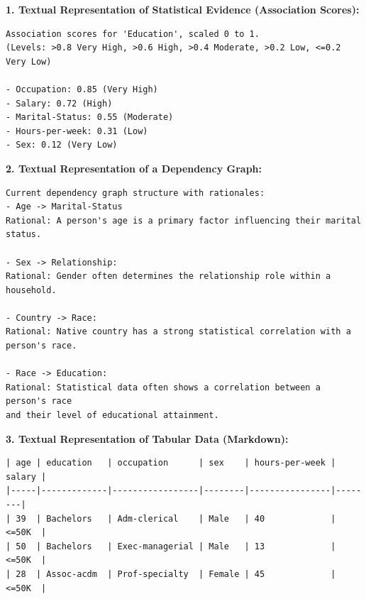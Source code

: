 \begin{tcolorbox}[
    float*=t, width=\textwidth, floatplacement=htbp,
    colback=teal!10!white,  %
    colframe=teal!60!black, %
    title={Examples of Data Textualization for LLM Prompts}, %
    fonttitle=\bfseries\color{white}, %
    arc=2mm, %
    boxrule=1pt %
] 

\small %

\textbf{1. Textual Representation of Statistical Evidence (Association Scores):}
\begin{verbatim}
Association scores for 'Education', scaled 0 to 1.
(Levels: >0.8 Very High, >0.6 High, >0.4 Moderate, >0.2 Low, <=0.2 Very Low)

- Occupation: 0.85 (Very High)
- Salary: 0.72 (High)
- Marital-Status: 0.55 (Moderate)
- Hours-per-week: 0.31 (Low)
- Sex: 0.12 (Very Low)
\end{verbatim}

\vspace{\medskipamount} %

\textbf{2. Textual Representation of a Dependency Graph:}
\begin{verbatim}
Current dependency graph structure with rationales:
- Age -> Marital-Status
Rational: A person's age is a primary factor influencing their marital status.

- Sex -> Relationship: 
Rational: Gender often determines the relationship role within a household.

- Country -> Race: 
Rational: Native country has a strong statistical correlation with a person's race.

- Race -> Education: 
Rational: Statistical data often shows a correlation between a person's race 
and their level of educational attainment.

\end{verbatim}

\vspace{\medskipamount} %

\textbf{3. Textual Representation of Tabular Data (Markdown):}
\begin{verbatim}
| age | education   | occupation      | sex    | hours-per-week | salary |
|-----|-------------|-----------------|--------|----------------|--------|
| 39  | Bachelors   | Adm-clerical    | Male   | 40             | <=50K  |
| 50  | Bachelors   | Exec-managerial | Male   | 13             | <=50K  |
| 28  | Assoc-acdm  | Prof-specialty  | Female | 45             | <=50K  |
\end{verbatim}
\label{box:textualization_examples}
\end{tcolorbox}




